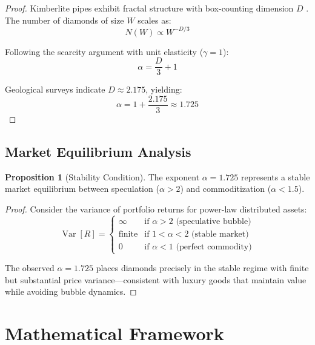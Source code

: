\documentclass[12pt,a4paper]{article}
\DeclareMathOperator{\Var}{Var}
\theoremstyle{definition}
\newtheorem{proposition}{Proposition}
\theoremstyle{remark}
\begin{document}
\begin{proof}
Kimberlite pipes exhibit fractal structure with box-counting dimension $D$ \citep{mandelbrot1982fractal}. The number of diamonds of size $W$ scales as:
\begin{equation}
N(W) \propto W^{-D/3}
\end{equation}

Following the scarcity argument with unit elasticity ($\gamma = 1$):
\begin{equation}
\alpha = \frac{D}{3} + 1
\end{equation}

Geological surveys indicate $D \approx 2.175$, yielding:
\begin{equation}
\alpha = 1 + \frac{2.175}{3} \approx 1.725
\end{equation}
\end{proof}

\subsection{Market Equilibrium Analysis}

\begin{proposition}[Stability Condition]
The exponent $\alpha = 1.725$ represents a stable market equilibrium between speculation ($\alpha > 2$) and commoditization ($\alpha < 1.5$).
\end{proposition}

\begin{proof}
Consider the variance of portfolio returns for power-law distributed assets:
\begin{equation}
\Var[R] = \begin{cases}
\infty & \text{if } \alpha > 2 \text{ (speculative bubble)} \\
\text{finite} & \text{if } 1 < \alpha < 2 \text{ (stable market)} \\
0 & \text{if } \alpha < 1 \text{ (perfect commodity)}
\end{cases}
\end{equation}

The observed $\alpha = 1.725$ places diamonds precisely in the stable regime with finite but substantial price variance—consistent with luxury goods that maintain value while avoiding bubble dynamics.
\end{proof}

\section{Mathematical Framework}
\end{document}
